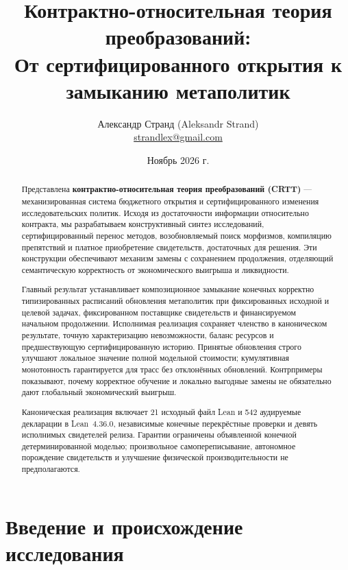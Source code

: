 \title{\textbf{Контрактно-относительная теория преобразований:}\\
\large От сертифицированного открытия к замыканию метаполитик}
\author{Александр Странд (Aleksandr Strand)\\[-1pt]{\small\href{mailto:strandlex@gmail.com}{strandlex@gmail.com}}}
\date{\vspace{-11pt}Ноябрь 2026 г.}
\maketitle

\begin{abstract}
Представлена \textbf{контрактно-относительная теория преобразований (CRTT)} --- механизированная система бюджетного открытия и сертифицированного изменения исследовательских политик. Исходя из достаточности информации относительно контракта, мы разрабатываем конструктивный синтез исследований, сертифицированный перенос методов, возобновляемый поиск морфизмов, компиляцию препятствий и платное приобретение свидетельств, достаточных для решения. Эти конструкции обеспечивают механизм замены с сохранением продолжения, отделяющий семантическую корректность от экономического выигрыша и ликвидности.

Главный результат устанавливает композиционное замыкание конечных корректно типизированных расписаний обновления метаполитик при фиксированных исходной и целевой задачах, фиксированном поставщике свидетельств и финансируемом начальном продолжении. Исполнимая реализация сохраняет членство в каноническом результате, точную характеризацию невозможности, баланс ресурсов и предшествующую сертифицированную историю. Принятые обновления строго улучшают локальное значение полной модельной стоимости; кумулятивная монотонность гарантируется для трасс без отклонённых обновлений. Контрпримеры показывают, почему корректное обучение и локально выгодные замены не обязательно дают глобальный экономический выигрыш.

Каноническая реализация включает 21 исходный файл Lean и 542 аудируемые декларации в Lean~4.36.0, независимые конечные перекрёстные проверки и девять исполнимых свидетелей релиза. Гарантии ограничены объявленной конечной детерминированной моделью; произвольное самопереписывание, автономное порождение свидетельств и улучшение физической производительности не предполагаются.
\end{abstract}

\section{Введение и происхождение исследования}
\label{sec:intro}

